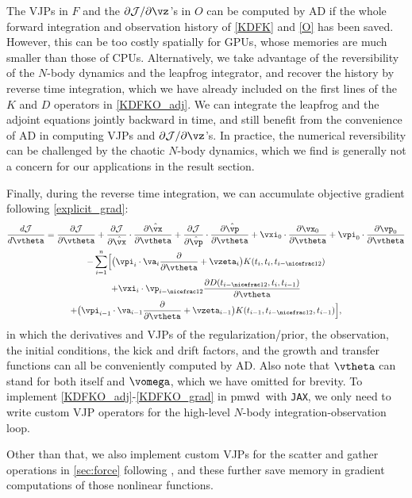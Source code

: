 \documentclass[modern, trackchanges, dvipsnames]{aastex631}
\newcommand{\pmwd}{{\usefont{T1}{nova}{m}{sl}pmwd}}
\renewcommand{\d}{d}
\newcommand{\p}{\partial}
\newcommand{\cJ}{\mathcal{J}}
\newcommand{\half}{\nicefrac12}
\begin{document}
The VJPs in $F$ and the $\p\cJ / \p\vz$'s in $O$ can be computed by AD
if the whole forward integration and observation history of \eqref{KDFK}
and \eqref{O} has been saved.
However, this can be too costly spatially for GPUs, whose memories are
much smaller than those of CPUs.
Alternatively, we take advantage of the reversibility of the $N$-body
dynamics and the leapfrog integrator, and recover the history by reverse
time integration, which we have already included on the first lines of
the $K$ and $D$ operators in \eqref{KDFKO_adj}.
We can integrate the leapfrog and the adjoint equations jointly backward
in time, and still benefit from the convenience of AD in computing VJPs
and $\p\cJ / \p\vz$'s.
In practice, the numerical reversibility can be challenged by the
chaotic $N$-body dynamics, which we find is generally not a concern for
our applications in the result section.

Finally, during the reverse time integration, we can accumulate
objective gradient following \eqref{explicit_grad}:
%
\begin{multline}
\frac{\d\cJ}{\d\vtheta} = \frac{\p\cJ}{\p\vtheta}
%
+ \frac{\p\cJ}{\p\hat\vx} \cdot \frac{\p\hat\vx}{\p\vtheta}
+ \frac{\p\cJ}{\p\hat\vp} \cdot \frac{\p\hat\vp}{\p\vtheta}
%
+ \vxi_0 \cdot \frac{\p\vx_0}{\p\vtheta}
+ \vpi_0 \cdot \frac{\p\vp_0}{\p\vtheta} \\
%
- \sum_{i=1}^n \Bigl[
  \bigl( \vpi_i \cdot\va_i \frac\p{\p\vtheta} + \vzeta_i
    \bigr) K(t_i, t_i, t_{i-\half}) \\
  + \vxi_i \cdot \vp_{i-\half}
    \frac{\p D(t_{i-\half}, t_i, t_{i-1})}{\p\vtheta} \\
  + \bigl( \vpi_{i-1} \cdot \va_{i-1} \frac\p{\p\vtheta} + \vzeta_{i-1}
    \bigr) K(t_{i-1}, t_{i-\half}, t_{i-1})
  \Bigr],
\label{KDFKO_grad}
\end{multline}
%
in which the derivatives and VJPs of the regularization/prior, the
observation, the initial conditions, the kick and drift factors, and the
growth and transfer functions can all be conveniently computed by AD.
Also note that $\vtheta$ can stand for both itself and $\vomega$, which
we have omitted for brevity.
To implement \eqref{KDFKO_adj}-\eqref{KDFKO_grad} in \pmwd\ with
\texttt{JAX}, we only need to write custom VJP operators for the
high-level $N$-body integration-observation loop.

Other than that, we also implement custom VJPs for the scatter and
gather operations in \autoref{sec:force} following \citet{Feng2017}, and
these further save memory in gradient computations of those nonlinear
functions.
\end{document}

